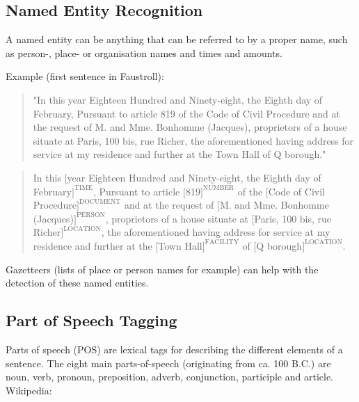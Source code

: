 \subsection*{Named Entity Recognition}

A named entity can be anything that can be referred to by a proper name, such as person-, place- or organisation names and times and amounts.

Example (first sentence in Faustroll):

\begin{quote}
  "In this year Eighteen Hundred and Ninety-eight, the Eighth day of February, Pursuant to article 819 of the Code of Civil Procedure and at the request of M. and Mme. Bonhomme (Jacques), proprietors of a house situate at Paris, 100 bis, rue Richer, the aforementioned having address for service at my residence and further at the Town Hall of Q borough."
\end{quote}

\begin{quote}
  In this $[$year Eighteen Hundred and Ninety-eight, the Eighth day of February$]^{\text{TIME}}$, Pursuant to article $[$819$]^{\text{NUMBER}}$ of the $[$Code of Civil Procedure$]^{\text{DOCUMENT}}$ and at the request of $[$M. and Mme. Bonhomme (Jacques)$]^{\text{PERSON}}$, proprietors of a house situate at $[$Paris, 100 bis, rue Richer$]^{\text{LOCATION}}$, the aforementioned having address for service at my residence and further at the $[$Town Hall$]^{\text{FACILITY}}$ of $[$Q borough$]^{\text{LOCATION}}$.
\end{quote}

Gazetteers (lists of place or person names for example) can help with the detection of these named entities.

\subsection*{Part of Speech Tagging}

Parts of speech (POS) are lexical tags for describing the different elements of a sentence. The eight main parts-of-speech (originating from ca. 100 B.C.) are noun, verb, pronoun, preposition, adverb, conjunction, participle and article.
Wikipedia:

